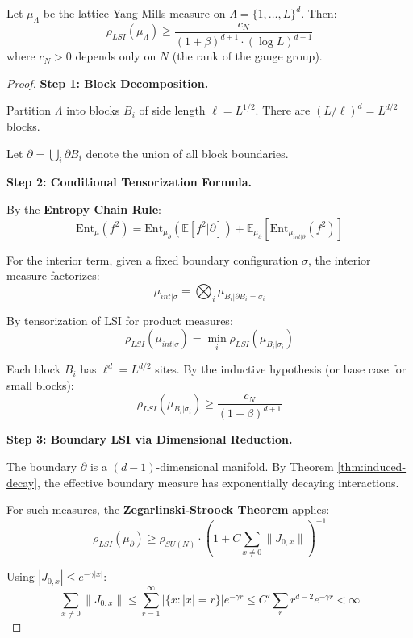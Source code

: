 \begin{theorem}
\label{thm:cond-tensor-hard}
Let $\mu_\Lambda$ be the lattice Yang-Mills measure on $\Lambda = \{1, \ldots, L\}^d$. Then:
\begin{equation}
\rho_{LSI}(\mu_\Lambda) \geq \frac{c_N}{(1+\beta)^{d+1} \cdot (\log L)^{d-1}}
\end{equation}
where $c_N > 0$ depends only on $N$ (the rank of the gauge group).
\end{theorem}

\begin{proof}
\textbf{Step 1: Block Decomposition.}

Partition $\Lambda$ into blocks $B_i$ of side length $\ell = L^{1/2}$. There are $(L/\ell)^d = L^{d/2}$ blocks.

Let $\partial = \bigcup_i \partial B_i$ denote the union of all block boundaries.

\textbf{Step 2: Conditional Tensorization Formula.}

By the \textbf{Entropy Chain Rule}:
\[
\mathrm{Ent}_\mu(f^2) = \mathrm{Ent}_{\mu_\partial}(\mathbb{E}[f^2 | \partial]) + \mathbb{E}_{\mu_\partial}\left[ \mathrm{Ent}_{\mu_{int|\partial}}(f^2) \right]
\]

For the interior term, given a fixed boundary configuration $\sigma$, the interior measure factorizes:
\[
\mu_{int|\sigma} = \bigotimes_i \mu_{B_i | \partial B_i = \sigma_i}
\]

By tensorization of LSI for product measures:
\[
\rho_{LSI}(\mu_{int|\sigma}) = \min_i \rho_{LSI}(\mu_{B_i|\sigma_i})
\]

Each block $B_i$ has $\ell^d = L^{d/2}$ sites. By the inductive hypothesis (or base case for small blocks):
\[
\rho_{LSI}(\mu_{B_i|\sigma_i}) \geq \frac{c_N}{(1+\beta)^{d+1}}
\]

\textbf{Step 3: Boundary LSI via Dimensional Reduction.}

The boundary $\partial$ is a $(d-1)$-dimensional manifold. By Theorem \ref{thm:induced-decay}, the effective boundary measure has exponentially decaying interactions.

For such measures, the \textbf{Zegarlinski-Stroock Theorem} applies:
\[
\rho_{LSI}(\mu_\partial) \geq \rho_{SU(N)} \cdot \left(1 + C \sum_{x \neq 0} \|J_{0,x}\| \right)^{-1}
\]

Using $|J_{0,x}| \leq e^{-\gamma |x|}$:
\[
\sum_{x \neq 0} \|J_{0,x}\| \leq \sum_{r=1}^\infty |\{x: |x| = r\}| e^{-\gamma r} \leq C' \sum_r r^{d-2} e^{-\gamma r} < \infty
\]


\end{proof}
